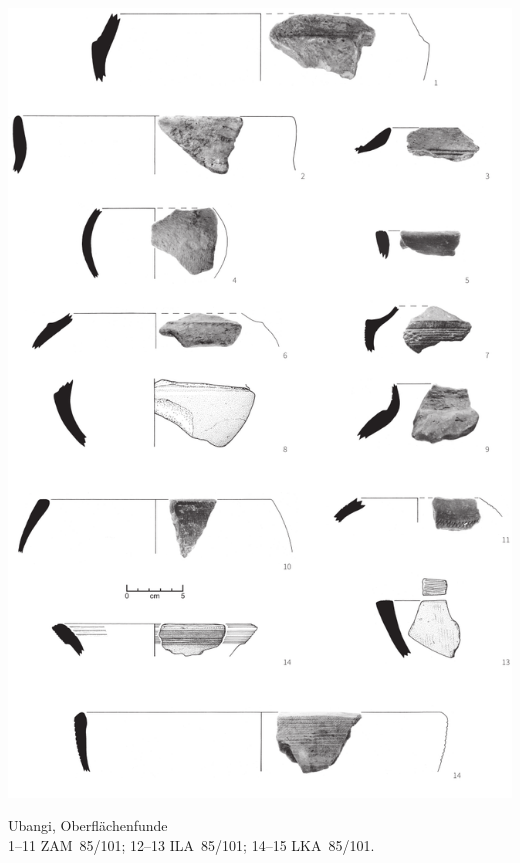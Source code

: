 \begin{pl}[H]
	\includegraphics{plt/Taf3.pdf}
	\vspace{.75em}\caption{\mbox{Ubangi}, Oberflächenfunde \\ 1--11 ZAM~85/101; 12--13 ILA~85/101; 14--15 LKA~85/101.}
	\label{pl:3}
\end{pl}

